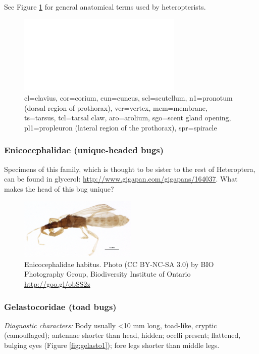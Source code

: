 \documentclass[letterpaper, 11pt]{article}
\begin{document}
\noindent{}See Figure \ref{fig:anatomy} for general anatomical terms used by heteropterists.\\

\begin{figure}[ht!]
 \centering
 \includegraphics[width=0.7\textwidth]{image14}
 \caption{cl=clavius, cor=corium, cun=cuneus, scl=scutellum, n1=pronotum (dorsal region of prothorax), ver=vertex, mem=membrane, ts=tarsus, tcl=tarsal claw, aro=arolium, sgo=scent gland opening, pl1=propleuron (lateral region of the prothorax), spr=spiracle}
 \label{fig:anatomy}
\end{figure}

\subsubsection{Enicocephalidae (unique-headed bugs)}
\noindent{}Specimens of this family, which is thought to be sister to the rest of Heteroptera, can be found in glycerol: \url{http://www.gigapan.com/gigapans/164037}. What makes the head of this bug unique?\vspace{3cm}

\begin{figure}[ht!]
 \centering
 \includegraphics[width=0.5\textwidth]{EnicocephalidHabitus}
 \caption{Enicocephalidae habitus. Photo (CC BY-NC-SA 3.0) by BIO Photography Group, Biodiversity Institute of Ontario \url{http://goo.gl/obSS2z}}
 \label{fig:enicocephalid}
\end{figure}

\subsubsection{Gelastocoridae (toad bugs)}
\noindent{}\textit{Diagnostic characters:} Body usually \textless{}10 mm long, toad-like, cryptic (camouflaged); antennae shorter than head, hidden; ocelli present; flattened, bulging eyes (Figure \ref{fig:gelasto1}); fore legs shorter than middle legs.\\
\end{document}

